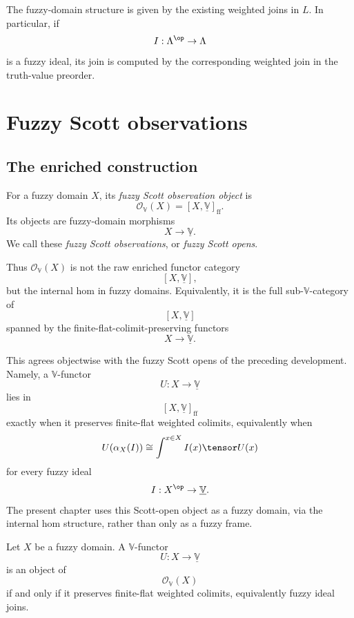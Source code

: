 The fuzzy-domain structure is given by the existing weighted joins in \(L\).
In particular, if
\[
    I:\Lambda^{\op}\to\Lambda
\]
is a fuzzy ideal, its join is computed by the corresponding weighted join in
the truth-value preorder.

\section{Fuzzy Scott observations}
\label{sec:fuzzy-scott-observations}

\subsection{The enriched construction}
\label{subsec:fuzzy-scott-observations-enriched}

\begin{definition}
\label{def:fuzzy-scott-observation-object}
For a fuzzy domain \(X\), its \emph{fuzzy Scott observation object} is
\[
    \mathcal O_{\mathbb V}(X)
    =
    [X,\underline{\mathbb V}]_{\mathrm{ff}}.
\]
Its objects are fuzzy-domain morphisms
\[
    X\to\underline{\mathbb V}.
\]
We call these \emph{fuzzy Scott observations}, or \emph{fuzzy Scott opens}.
\end{definition}

Thus \(\mathcal O_{\mathbb V}(X)\) is not the raw enriched functor category
\[
    [X,\underline{\mathbb V}],
\]
but the internal hom in fuzzy domains.  Equivalently, it is the full
sub-\(\mathbb V\)-category of
\[
    [X,\underline{\mathbb V}]
\]
spanned by the finite-flat-colimit-preserving functors
\[
    X\to\underline{\mathbb V}.
\]

This agrees objectwise with the fuzzy Scott opens of the preceding development.
Namely, a \(\mathbb V\)-functor
\[
    U:X\to\underline{\mathbb V}
\]
lies in
\[
    [X,\underline{\mathbb V}]_{\mathrm{ff}}
\]
exactly when it preserves finite-flat weighted colimits, equivalently when
\[
    U(\alpha_X(I))
    \cong
    \int^{x\in X} I(x)\tensor U(x)
\]
for every fuzzy ideal
\[
    I:X^{\op}\to\underline{\mathbb V}.
\]
The present chapter uses this Scott-open object as a fuzzy domain, via the
internal hom structure, rather than only as a fuzzy frame.

\begin{proposition}
\label{prop:fuzzy-scott-observations-preserve-ideal-joins}
Let \(X\) be a fuzzy domain.  A \(\mathbb V\)-functor
\[
    U:X\to\underline{\mathbb V}
\]
is an object of
\[
    \mathcal O_{\mathbb V}(X)
\]
if and only if it preserves finite-flat weighted colimits, equivalently fuzzy
ideal joins.
\end{proposition}

